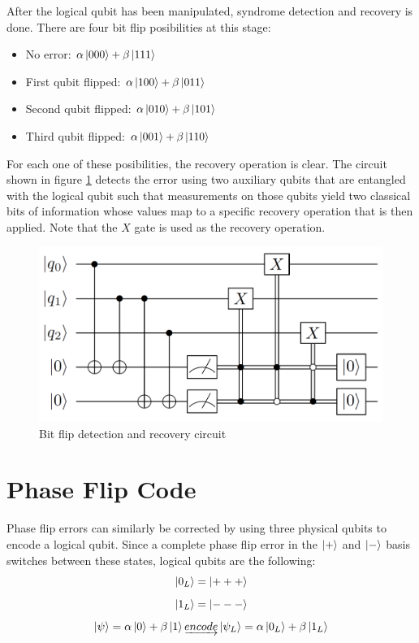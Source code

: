 After the logical qubit has been manipulated, syndrome detection and recovery is done. There are four bit flip posibilities at this stage:
\begin{itemize}[noitemsep]
    \item No error: $\alpha\left|{000}\right\rangle+\beta\left|{111}\right\rangle$
    \item First qubit flipped: $\alpha\left|{100}\right\rangle+\beta\left|{011}\right\rangle$
    \item Second qubit flipped: $\alpha\left|{010}\right\rangle+\beta\left|{101}\right\rangle$
    \item Third qubit flipped: $\alpha\left|{001}\right\rangle+\beta\left|{110}\right\rangle$
\end{itemize}

For each one of these posibilities, the recovery operation is clear. The circuit shown in figure \ref{fig:BitFlipDetectionAndRecoveryCircuit} detects the error using two auxiliary qubits that are entangled with the logical qubit such that measurements on those qubits yield two classical bits of information whose values map to a specific recovery operation that is then applied. Note that the $X$ gate is used as the recovery operation.

\begin{figure}[h!]
    \centering
    \includegraphics[scale=.25]{images/ErrorCorrection-BitFlipDetectionAndRecoveryCircuit.png}
    \caption{Bit flip detection and recovery circuit \cite{ThomasWong_2022}}
    \label{fig:BitFlipDetectionAndRecoveryCircuit}
\end{figure}

\section{Phase Flip Code}

Phase flip errors can similarly be corrected by using three physical qubits to encode a logical qubit. Since a complete phase flip error in the $\left|{+}\right\rangle$ and $\left|{-}\right\rangle$ basis switches between these states, logical qubits are the following:
$$\left|{0_L}\right\rangle=\left|{+++}\right\rangle$$
$$\left|{1_L}\right\rangle=\left|{---}\right\rangle$$
$$\left|{\psi}\right\rangle=\alpha\left|{0}\right\rangle+\beta\left|{1}\right\rangle  \underrightarrow{encode}  \left|{{\psi}_{L}}\right\rangle=\alpha\left|{0_L}\right\rangle+\beta\left|{1_L}\right\rangle$$

